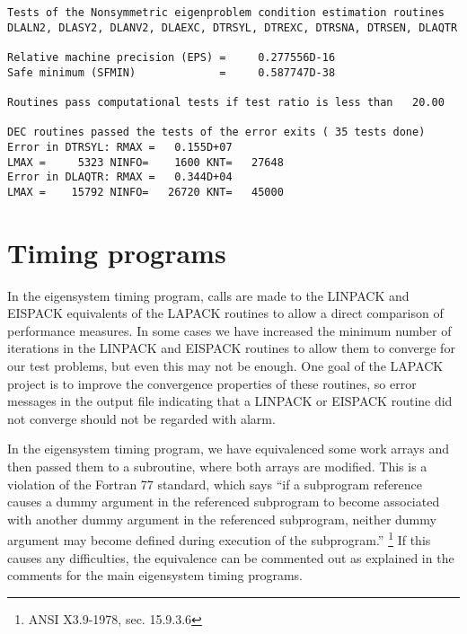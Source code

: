 \begin{verbatim}
Tests of the Nonsymmetric eigenproblem condition estimation routines
DLALN2, DLASY2, DLANV2, DLAEXC, DTRSYL, DTREXC, DTRSNA, DTRSEN, DLAQTR

Relative machine precision (EPS) =     0.277556D-16
Safe minimum (SFMIN)             =     0.587747D-38

Routines pass computational tests if test ratio is less than   20.00

DEC routines passed the tests of the error exits ( 35 tests done)
Error in DTRSYL: RMAX =   0.155D+07
LMAX =     5323 NINFO=    1600 KNT=   27648
Error in DLAQTR: RMAX =   0.344D+04
LMAX =    15792 NINFO=   26720 KNT=   45000
\end{verbatim}

\section{Timing programs}

In the eigensystem timing program, calls are made to the LINPACK
and EISPACK equivalents of the LAPACK routines to allow a direct
comparison of performance measures.
In some cases we have increased the minimum number of
iterations in the LINPACK and EISPACK routines to allow
them to converge for our test problems, but
even this may not be enough.
One goal of the LAPACK project is to improve the convergence
properties of these routines, so error messages in the output
file indicating that a LINPACK or EISPACK routine did not
converge should not be regarded with alarm.

In the eigensystem timing program, we have equivalenced some work
arrays and then passed them to a subroutine, where both arrays are
modified.  This is a violation of the Fortran 77 standard, which
says ``if a subprogram reference causes a dummy argument in the
referenced subprogram to become associated with another dummy
argument in the referenced subprogram, neither dummy argument may
become defined during execution of the subprogram.''
\footnote{ ANSI X3.9-1978, sec. 15.9.3.6}
If this causes any difficulties, the equivalence
can be commented out as explained in the comments for the main
eigensystem timing programs.


